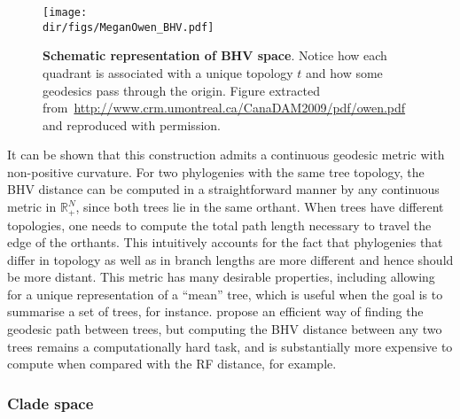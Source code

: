 \begin{figure}[!ht]
  \begin{center}
  \texttt{[image: \\dir/figs/MeganOwen\_BHV.pdf]} 
  \end{center}
\caption[Schematic representation of BHV space.]{\textbf{Schematic representation of BHV space}.
Notice how each quadrant is associated with a unique topology $t$ and how some geodesics pass through the origin.
Figure extracted from~\url{http://www.crm.umontreal.ca/CanaDAM2009/pdf/owen.pdf} and reproduced with permission.
}
\label{fig:bhv_representation}
\end{figure}

It can be shown that this construction admits a continuous geodesic metric with non-positive curvature.
For two phylogenies with the same tree topology, the BHV distance can be computed in a straightforward manner by any continuous metric in $\mathbb{R}_+^{N}$, since both trees lie in the same orthant.
When trees have different topologies, one needs to compute the total path length necessary to travel the edge of the orthants.
This intuitively accounts for the fact that phylogenies that differ in topology as well as in branch lengths are more different and hence should be more distant. 
This metric has many desirable properties, including allowing for a unique representation of a ``mean'' tree, which is useful when the goal is to summarise a set of trees, for instance.
\cite{Owen2011} propose an efficient way of finding the geodesic path between trees, but computing the BHV distance between any two trees remains a computationally hard task, and is substantially more expensive to compute when compared with the RF distance, for example.

\subsubsection{Clade space}

